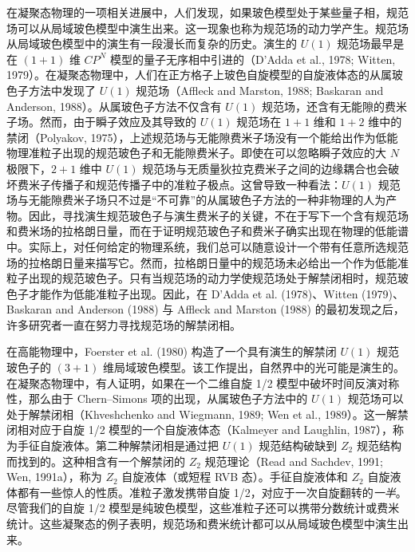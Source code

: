 在凝聚态物理的一项相关进展中，人们发现，如果玻色模型处于某些量子相，规范场可以从局域玻色模型中演生出来。这一现象也称为规范场的动力学产生。规范场从局域玻色模型中的演生有一段漫长而复杂的历史。演生的 $U(1)$ 规范场最早是在 $(1+1)$ 维 $CP^{N}$ 模型的量子无序相中引进的（D'Adda et al., 1978; Witten, 1979）。在凝聚态物理中，人们在正方格子上玻色自旋模型的自旋液体态的从属玻色子方法中发现了 $U(1)$ 规范场（Affleck and Marston, 1988; Baskaran and Anderson, 1988）。从属玻色子方法不仅含有 $U(1)$ 规范场，还含有无能隙的费米子场。然而，由于瞬子效应及其导致的 $U(1)$ 规范场在 $1+1$ 维和 $1+2$ 维中的禁闭（Polyakov, 1975），上述规范场与无能隙费米子场没有一个能给出作为低能物理准粒子出现的规范玻色子和无能隙费米子。即使在可以忽略瞬子效应的大 $N$ 极限下，$2+1$ 维中 $U(1)$ 规范场与无质量狄拉克费米子之间的边缘耦合也会破坏费米子传播子和规范传播子中的准粒子极点。这曾导致一种看法：$U(1)$ 规范场与无能隙费米子场只不过是“不可靠”的从属玻色子方法的一种非物理的人为产物。因此，寻找演生规范玻色子与演生费米子的关键，不在于写下一个含有规范场和费米场的拉格朗日量，而在于证明规范玻色子和费米子确实出现在物理的低能谱中。实际上，对任何给定的物理系统，我们总可以随意设计一个带有任意所选规范场的拉格朗日量来描写它。然而，拉格朗日量中的规范场未必给出一个作为低能准粒子出现的规范玻色子。只有当规范场的动力学使规范场处于解禁闭相时，规范玻色子才能作为低能准粒子出现。因此，在 D'Adda et al. (1978)、Witten (1979)、Baskaran and Anderson (1988) 与 Affleck and Marston (1988) 的最初发现之后，许多研究者一直在努力寻找规范场的解禁闭相。

在高能物理中，Foerster et al. (1980) 构造了一个具有演生的解禁闭 $U(1)$ 规范玻色子的 $(3+1)$ 维局域玻色模型。该工作提出，自然界中的光可能是演生的。在凝聚态物理中，有人证明，如果在一个二维自旋 1/2 模型中破坏时间反演对称性，那么由于 Chern--Simons 项的出现，从属玻色子方法中的 $U(1)$ 规范场可以处于解禁闭相（Khveshchenko and Wiegmann, 1989; Wen et al., 1989）。这一解禁闭相对应于自旋 1/2 模型的一个自旋液体态（Kalmeyer and Laughlin, 1987），称为手征自旋液体。第二种解禁闭相是通过把 $U(1)$ 规范结构破缺到 $Z_2$ 规范结构而找到的。这种相含有一个解禁闭的 $Z_2$ 规范理论（Read and Sachdev, 1991; Wen, 1991a），称为 $Z_2$ 自旋液体（或短程 RVB 态）。手征自旋液体和 $Z_2$ 自旋液体都有一些惊人的性质。准粒子激发携带自旋 1/2，对应于一次自旋翻转的\emph{一半}。尽管我们的自旋 1/2 模型是纯玻色模型，这些准粒子还可以携带分数统计或费米统计。这些凝聚态的例子表明，规范场和费米统计都可以从局域玻色模型中演生出来。

